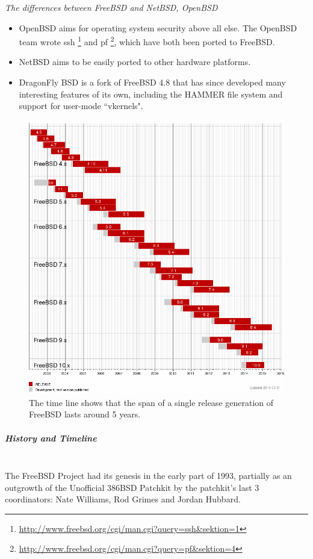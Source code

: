 \documentclass[11pt]{article} %
\begin{document}
\textit{The differences between FreeBSD and NetBSD, OpenBSD}
\begin{itemize}
\item OpenBSD aims for operating system security above all else. The OpenBSD team wrote ssh \footnote{\url {http://www.freebsd.org/cgi/man.cgi?query=ssh&sektion=1}} and pf \footnote{\url{http://www.freebsd.org/cgi/man.cgi?query=pf&sektion=4}}, which have both been ported to FreeBSD.
\item NetBSD aims to be easily ported to other hardware platforms.
\item  DragonFly BSD is a fork of FreeBSD 4.8 that has since developed many interesting features of its own, including the HAMMER file system and support for user-mode ``vkernels".
\end{itemize}
       \begin{figure}
   \centering
        \includegraphics[scale=0.4]{./freebsd.png}
     \caption{ The time line shows that the span of a single release generation of FreeBSD lasts around 5 years.}
      \end{figure}


  \subparagraph{History and Timeline} \mbox{} \\
The FreeBSD Project had its genesis in the early part of 1993, partially as an outgrowth of the Unofficial 386BSD Patchkit by the patchkit's last 3 coordinators: Nate Williams, Rod Grimes and Jordan Hubbard.
\end{document}

